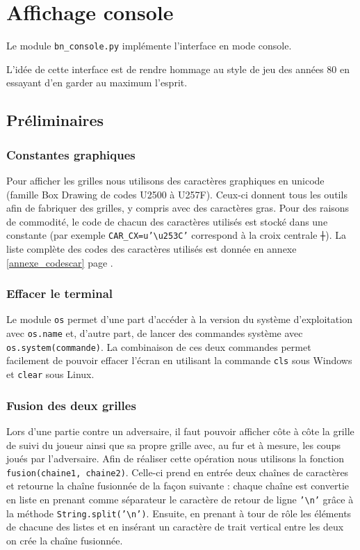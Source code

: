 \chapter{Affichage console}
Le module \texttt{bn\_console.py} implémente l'interface en mode console.

L'idée de cette interface est de rendre hommage au style de jeu des années 80 en essayant d'en garder au maximum l'esprit.

\section{Préliminaires}
\subsection{Constantes graphiques}
Pour afficher les grilles nous utilisons des caractères graphiques en unicode (famille Box Drawing de codes U2500 à U257F). Ceux-ci donnent tous les outils afin de fabriquer des grilles, y compris avec des caractères gras. Pour des raisons de commodité, le code de chacun des caractères utilisés est stocké dans une constante (par exemple \texttt{CAR\_CX=u'\textbackslash u253C'} correspond à la croix centrale \texttt{┼}). La liste complète des codes des caractères utilisés est donnée en annexe \ref{annexe_codescar} page \pageref{annexe_codescar}.

\subsection{Effacer le terminal}
Le module \texttt{os} permet d'une part d'accéder à la version du système d'exploitation avec \texttt{os.name} et, d'autre part, de lancer des commandes système avec \texttt{os.system(commande)}. La combinaison de ces deux commandes permet facilement de pouvoir effacer l'écran en utilisant la commande \texttt{cls} sous Windows et \texttt{clear} sous Linux.

\subsection{Fusion des deux grilles}
Lors d'une partie contre un adversaire, il faut pouvoir afficher côte à côte la grille de suivi du joueur ainsi que sa propre grille avec, au fur et à mesure, les coups joués par l'adversaire. Afin de réaliser cette opération nous utilisons la fonction \texttt{fusion(chaine1, chaine2)}. Celle-ci prend en entrée deux chaînes de caractères et retourne la chaîne fusionnée de la façon suivante : chaque chaîne est convertie en liste en prenant comme séparateur le caractère de retour de ligne \texttt{'\textbackslash n'} grâce à la méthode \texttt{String.split('\textbackslash n')}. Ensuite, en prenant à tour de rôle les éléments de chacune des listes et en insérant un caractère de trait vertical entre les deux on crée la chaîne fusionnée. 


